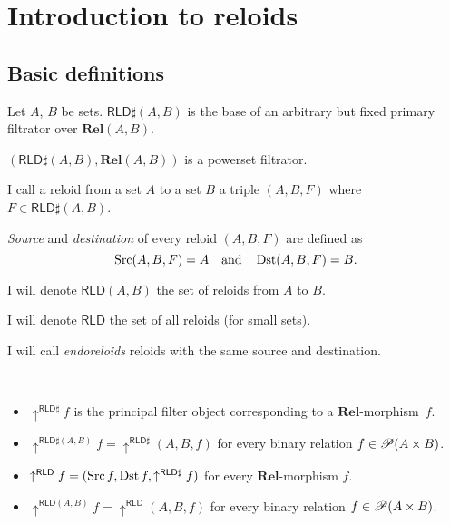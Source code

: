 \chapter{Introduction to reloids}

\section{Basic definitions}

\begin{defn}
Let $A$, $B$ be sets.
$\mathsf{RLD}\sharp(A,B)$ is the base of an arbitrary but fixed primary filtrator over $\mathbf{Rel}(A,B)$.
\end{defn}

\begin{obvious}
$(\mathsf{RLD}\sharp(A,B),\mathbf{Rel}(A,B))$ is a powerset filtrator.
\end{obvious}

\begin{defn}
I call a reloid from a set $A$ to a set $B$ a triple
$(A,B,F)$ where $F\in\mathsf{RLD}\sharp(A,B)$.
\end{defn}

\begin{defn}
\emph{Source} and
\emph{destination} of every reloid $(A,B,F)$ are defined as
\[
\operatorname{Src}(A,B,F)=A\quad\text{and}\quad\operatorname{Dst}(A,B,F)=B.
\]

\end{defn}
I will denote $\mathsf{RLD}(A,B)$ the set of reloids from $A$ to
$B$.

I will denote $\mathsf{RLD}$ the set of all reloids (for small sets).

\begin{defn}
I will call \emph{endoreloids} reloids with the
same source and destination.
\end{defn}

\begin{defn}
~
\begin{itemize}
\item $\uparrow^{\mathsf{RLD}\sharp}f$ is the principal filter object corresponding to a $\mathbf{Rel}$-morphism~$f$.
\item $\uparrow^{\mathsf{RLD}\sharp(A,B)} f=\uparrow^{\mathsf{RLD}\sharp}(A,B,f)$ for every binary relation $f\in\mathscr{P}(A\times B)$.
\item $\uparrow^{\mathsf{RLD}}f=(\operatorname{Src} f,\operatorname{Dst} f,\uparrow^{\mathsf{RLD}\sharp}f)$
for every $\mathbf{Rel}$-morphism $f$.
\item $\uparrow^{\mathsf{RLD}(A,B)}f=\uparrow^{\mathsf{RLD}}(A,B,f)$ for every binary relation $f\in\mathscr{P}(A\times B)$.
\end{itemize}
\end{defn}

